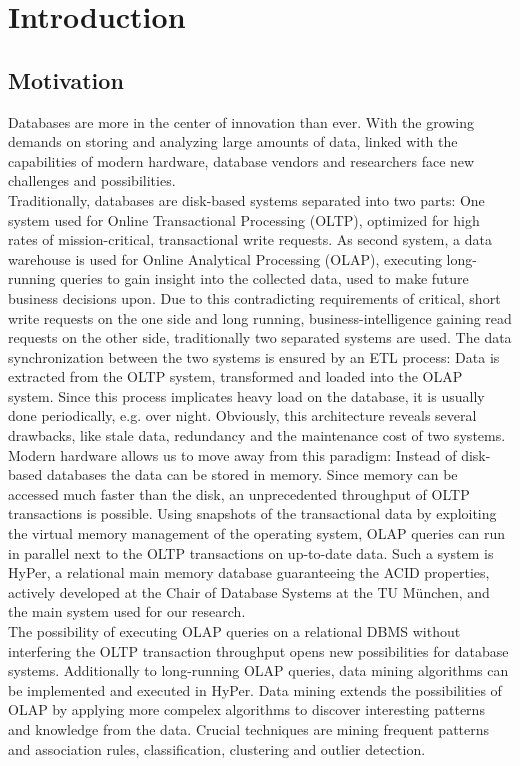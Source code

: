 \chapter{Introduction}\label{chapter:introduction}

\section{Motivation}


Databases are more in the center of innovation than ever. With the growing demands on storing and analyzing large amounts of data, linked with the capabilities of modern hardware, database vendors and researchers face new challenges and possibilities. 
\\
Traditionally, databases are disk-based systems separated into two parts: One system used for Online Transactional Processing (OLTP), optimized for high rates of mission-critical, transactional write requests. As second system, a data warehouse is used for Online Analytical Processing (OLAP), executing long-running queries to gain insight into the  collected data, used to make future business decisions upon. Due to this contradicting requirements of critical, short write requests on the one side and long running, business-intelligence gaining read requests on the other side, traditionally two separated systems are used. The data synchronization between the two systems is ensured by an ETL process: Data is extracted from the OLTP system, transformed and loaded into the OLAP system. Since this process implicates heavy load on the database, it is usually done periodically, e.g. over night. Obviously, this architecture reveals several drawbacks, like stale data, redundancy and the maintenance cost of two systems.
\\
Modern hardware allows us to move away from this paradigm: Instead of disk-based databases the data can be stored in memory. Since memory can be accessed much faster than the disk, an unprecedented throughput of OLTP transactions is possible. Using snapshots of the transactional data by exploiting the virtual memory management of the operating system, OLAP queries can run in parallel next to the OLTP transactions on up-to-date data. Such a system is HyPer, a relational main memory database guaranteeing the ACID properties, actively developed at the Chair of Database Systems at the TU München, and the main system used for our research. 
\\
The possibility of executing OLAP queries on a relational DBMS without interfering the OLTP transaction throughput opens new possibilities for database systems. Additionally to long-running OLAP queries, data mining algorithms can be implemented and executed in HyPer. Data mining extends the possibilities of OLAP by applying more compelex algorithms to discover interesting patterns and knowledge from the data. Crucial techniques are mining frequent patterns and association rules, classification, clustering and outlier detection.
